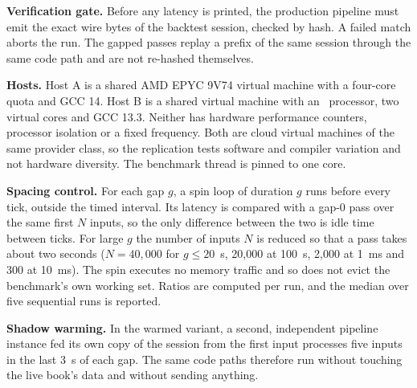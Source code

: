 \documentclass{ieeeaccess}
\begin{document}
\textbf{Verification gate.} Before any latency is printed, the production pipeline must emit the exact wire bytes of the backtest session, checked by hash. A failed match aborts the run. The gapped passes replay a prefix of the same session through the same code path and are not re-hashed themselves.

\textbf{Hosts.} Host A is a shared AMD EPYC 9V74 virtual machine with a four-core quota and GCC 14. Host B is a shared virtual machine with an \HostBCpu\ processor, two virtual cores and GCC 13.3. Neither has hardware performance counters, processor isolation or a fixed frequency. Both are cloud virtual machines of the same provider class, so the replication tests software and compiler variation and not hardware diversity. The benchmark thread is pinned to one core.

\textbf{Spacing control.} For each gap $g$, a spin loop of duration $g$ runs before every tick, outside the timed interval. Its latency is compared with a gap-0 pass over the same first $N$ inputs, so the only difference between the two is idle time between ticks. For large $g$ the number of inputs $N$ is reduced so that a pass takes about two seconds ($N=40{,}000$ for $g\le 20$~\textmu s, 20{,}000 at 100~\textmu s, 2{,}000 at 1~ms and 300 at 10~ms). The spin executes no memory traffic and so does not evict the benchmark's own working set. Ratios are computed per run, and the median over five sequential runs is reported.

\textbf{Shadow warming.} In the warmed variant, a second, independent pipeline instance fed its own copy of the session from the first input processes five inputs in the last 3~\textmu s of each gap. The same code paths therefore run without touching the live book's data and without sending anything.
\end{document}
